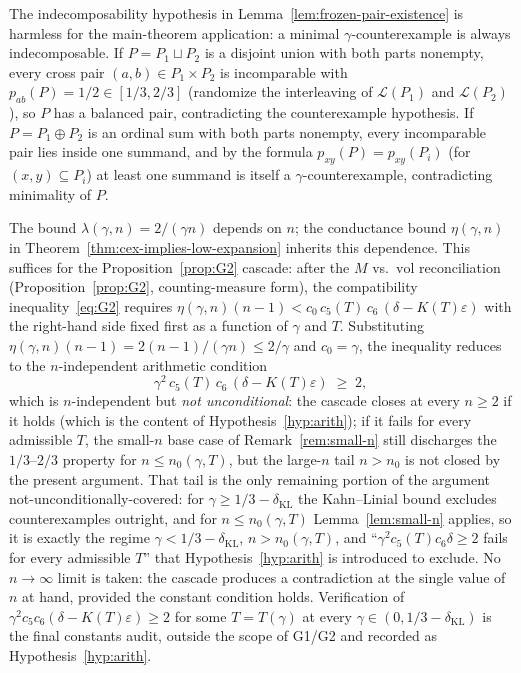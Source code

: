 \begin{remark}
\label{rem:decomp-reduction}
The indecomposability hypothesis in
Lemma~\ref{lem:frozen-pair-existence} is harmless for the main-theorem
application: a minimal $\gamma$-counterexample is always
indecomposable. If $P = P_1 \sqcup P_2$ is a disjoint union with
both parts nonempty, every cross pair
$(a,b) \in P_1 \times P_2$ is incomparable with $p_{ab}(P) = 1/2 \in
[1/3, 2/3]$ (randomize the interleaving of $\mathcal L(P_1)$ and
$\mathcal L(P_2)$), so $P$ has a balanced pair, contradicting the
counterexample hypothesis. If $P = P_1 \oplus P_2$ is an ordinal sum
with both parts nonempty, every incomparable pair lies inside one
summand, and by the formula $p_{xy}(P) = p_{xy}(P_i)$ (for $(x,y)
\subseteq P_i$) at least one summand is itself a
$\gamma$-counterexample, contradicting minimality of $P$.
\end{remark}

\begin{remark}
\label{rem:n-dependence-g1}
The bound $\lambda(\gamma, n) = 2/(\gamma n)$ depends on $n$; the
conductance bound $\eta(\gamma, n)$ in
Theorem~\ref{thm:cex-implies-low-expansion} inherits this dependence.
This suffices for the Proposition~\ref{prop:G2} cascade: after the
$M$ vs.\ $\mathrm{vol}$ reconciliation (Proposition~\ref{prop:G2},
counting-measure form), the compatibility inequality~\eqref{eq:G2}
requires $\eta(\gamma,n)(n-1) < c_0\, c_5(T)\, c_6\, (\delta -
K(T)\varepsilon)$ with the right-hand side fixed first as a function
of $\gamma$ and $T$. Substituting $\eta(\gamma,n)(n-1) =
2(n-1)/(\gamma n) \le 2/\gamma$ and $c_0 = \gamma$, the inequality
reduces to the $n$-independent arithmetic condition
\[
  \gamma^2\, c_5(T)\, c_6\, (\delta - K(T)\varepsilon) \;\ge\; 2,
\]
which is $n$-independent but \emph{not unconditional}: the cascade
closes at every $n \ge 2$ if it holds (which is the content of
Hypothesis~\ref{hyp:arith}); if it fails for every admissible $T$,
the small-$n$ base case of Remark~\ref{rem:small-n} still discharges
the $1/3$--$2/3$ property for $n \le n_0(\gamma, T)$, but the
large-$n$ tail $n > n_0$ is not closed by the present argument.
That tail is the only remaining portion of the argument
not-unconditionally-covered: for $\gamma \ge 1/3 -
\delta_{\mathrm{KL}}$ the Kahn--Linial bound excludes
counter\-examples outright, and for $n \le n_0(\gamma, T)$
Lemma~\ref{lem:small-n} applies, so it is exactly the regime
$\gamma < 1/3 - \delta_{\mathrm{KL}}$, $n > n_0(\gamma, T)$, and
``$\gamma^2 c_5(T) c_6 \delta \ge 2$ fails for every admissible
$T$'' that Hypothesis~\ref{hyp:arith} is introduced to exclude.
No $n \to \infty$ limit is taken: the cascade produces a
contradiction at the single value of $n$ at hand, provided the
constant condition holds. Verification of $\gamma^2 c_5 c_6 (\delta
- K(T)\varepsilon) \ge 2$ for some $T = T(\gamma)$ at every $\gamma
\in (0, 1/3 - \delta_{\mathrm{KL}})$ is the final
constants audit, outside the scope of G1/G2 and recorded as
Hypothesis~\ref{hyp:arith}.
\end{remark}

